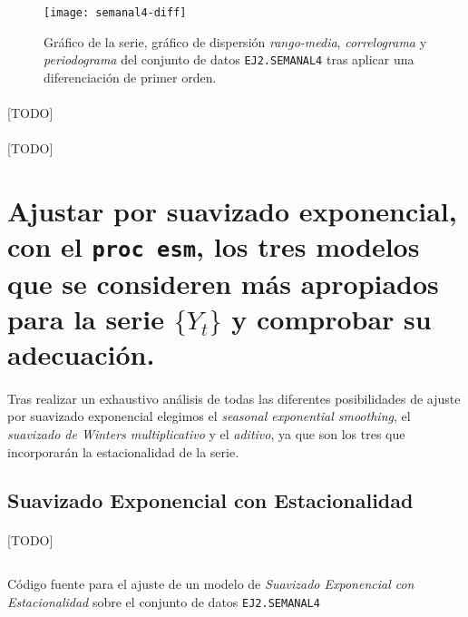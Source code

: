 \documentclass[a4paper, spanish]{article}
\begin{document}
      \begin{figure}[htb!]
        \centering
        \texttt{[image: semanal4-diff]}
        \caption{Gráfico de la serie, gráfico de dispersión \emph{rango-media}, \emph{correlograma} y \emph{periodograma} del conjunto de datos \texttt{EJ2.SEMANAL4} tras aplicar una diferenciación de primer orden.}
        \label{img:semanal4_diff}
      \end{figure}

      \paragraph{}
      [TODO]

    \paragraph{}
    [TODO]

  \section{Ajustar por suavizado exponencial, con el \texttt{proc esm}, los tres modelos que se consideren más apropiados para la serie $\{Y_t\}$ y comprobar su adecuación.}
  \label{sec:b}

    \paragraph{}
    Tras realizar un exhaustivo análisis de todas las diferentes posibilidades de ajuste por suavizado exponencial elegimos el \textit{seasonal exponential smoothing}, el \textit{suavizado de Winters multiplicativo} y el \textit{aditivo}, ya que son los tres que incorporarán la estacionalidad de la serie.

    \subsection{Suavizado Exponencial con Estacionalidad}

      \paragraph{}
      [TODO]

      \begin{listing}[htb!]
        \centering
        \inputminted{SAS}{./res/code/b-01-esm-seasonal.sas}
        \caption{Código fuente para el ajuste de un modelo de \emph{Suavizado Exponencial con Estacionalidad} sobre el conjunto de datos \texttt{EJ2.SEMANAL4}}
        \label{code:b_seasonal_esm}
      \end{listing}
\end{document}
